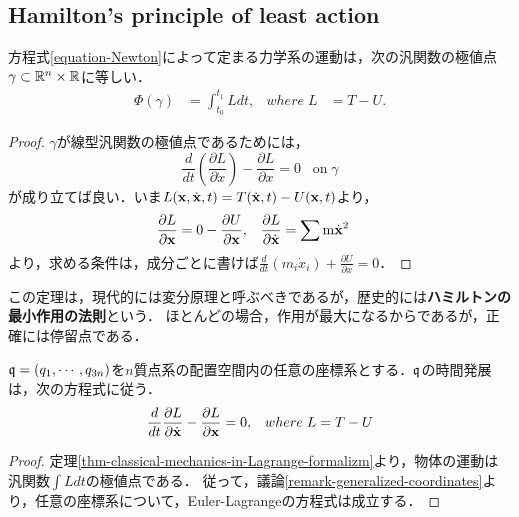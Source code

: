 \documentclass[uplatex,dvipdfmx]{jsreport}
\begin{document}
\subsection{Hamilton's principle of least action}

\begin{theorem}\label{thm-classical-mechanics-in-Lagrange-formalizm}
    方程式\ref{equation-Newton}によって定まる力学系の運動は，次の汎関数の極値点$\gamma\subset\mathbb{R}^n\times\mathbb{R}$に等しい．
    \begin{align*}
        \Phi(\gamma)&=\int^{t_1}_{t_0}Ldt,&where\;L&=T-U.
    \end{align*}
\end{theorem}
\begin{proof}
    $\gamma$が線型汎関数の極値点であるためには，
    \[ \frac{d}{dt}\left(\frac{\partial L}{\partial\dot{x}}\right) - \frac{\partial L}{\partial x} = 0\;\;\;\mathrm{on\;}\gamma \]
    が成り立てば良い．いま$L(\mathbf{x},\dot{\mathbf{x}},t)=T(\dot{\mathbf{x}},t)-U(\mathbf{x},t)$より，
    \begin{align*}
        \frac{\partial L}{\partial\mathbf{x}}&=0-\frac{\partial U}{\partial\mathbf{x}},&\frac{\partial L}{\partial\dot{\mathbf{x}}}&=\sum \mathrm{m}\dot{\mathbf{x}}^2
    \end{align*}
    より，求める条件は，成分ごとに書けば$\frac{d}{dt}(m_i\dot{x}_i)+\frac{\partial U}{\partial x}=0$．
\end{proof}
\begin{remark}
    この定理は，現代的には変分原理と呼ぶべきであるが，歴史的には\textbf{ハミルトンの最小作用の法則}という．
    ほとんどの場合，作用が最大になるからであるが，正確には停留点である．
\end{remark}

\begin{corollary}
    $\mathfrak{q}=(q_1,\cdots,q_{3n})$を$n$質点系の配置空間内の任意の座標系とする．$\mathfrak{q}$の時間発展は，次の方程式に従う．
    \begin{align*}
        \frac{d}{dt}\frac{\partial L}{\partial\dot{\mathbf{x}}}-\frac{\partial L}{\partial\mathbf{x}}&=0,&where\;L=T-U
    \end{align*}
\end{corollary}
\begin{proof}
    定理\ref{thm-classical-mechanics-in-Lagrange-formalizm}より，物体の運動は汎関数$\int Ldt$の極値点である．
    従って，議論\ref{remark-generalized-coordinates}より，任意の座標系について，Euler-Lagrangeの方程式は成立する．
\end{proof}
\end{document}
